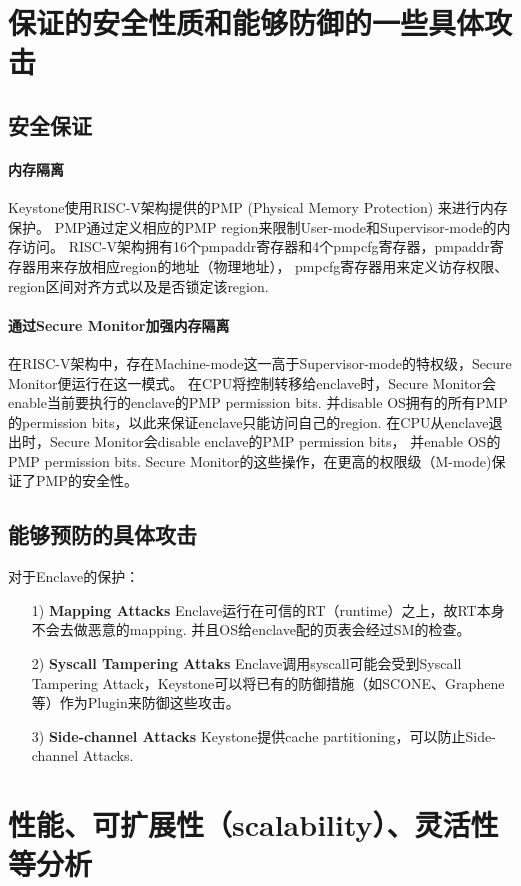 \section{保证的安全性质和能够防御的一些具体攻击}
\subsection{安全保证}
\paragraph{内存隔离}
Keystone使用RISC-V架构提供的PMP (Physical Memory Protection) 来进行内存保护\cite{keystone-p4}。
PMP通过定义相应的PMP region来限制User-mode和Supervisor-mode的内存访问。
RISC-V架构拥有16个pmpaddr寄存器和4个pmpcfg寄存器，pmpaddr寄存器用来存放相应region的地址（物理地址），
pmpcfg寄存器用来定义访存权限、region区间对齐方式以及是否锁定该region.
\paragraph{通过Secure Monitor加强内存隔离}
在RISC-V架构中，存在Machine-mode这一高于Supervisor-mode的特权级，Secure Monitor便运行在这一模式。
在CPU将控制转移给enclave时，Secure Monitor会enable当前要执行的enclave的PMP permission bits\cite{keystone-p3}. 
并disable OS拥有的所有PMP的permission bits，以此来保证enclave只能访问自己的region.
在CPU从enclave退出时，Secure Monitor会disable enclave的PMP permission bits，
并enable OS的PMP permission bits\cite{keystone-p4}.
Secure Monitor的这些操作，在更高的权限级（M-mode)保证了PMP的安全性。

\subsection{能够预防的具体攻击}
对于Enclave的保护：
\begin{itemize}
	\item [1)]
	\textbf{Mapping Attacks} Enclave运行在可信的RT（runtime）之上，故RT本身不会去做恶意的mapping. 并且OS给enclave配的页表会经过SM的检查。
	\item [2)]
	\textbf{Syscall Tampering Attaks} Enclave调用syscall可能会受到Syscall Tampering Attack，Keystone可以将已有的防御措施（如SCONE、Graphene等）作为Plugin来防御这些攻击。
	\item [3)]
	\textbf{Side-channel Attacks} Keystone提供cache partitioning，可以防止Side-channel Attacks\cite{sanctuary-p3}.
\end{itemize}

\section{性能、可扩展性（scalability）、灵活性等分析}
